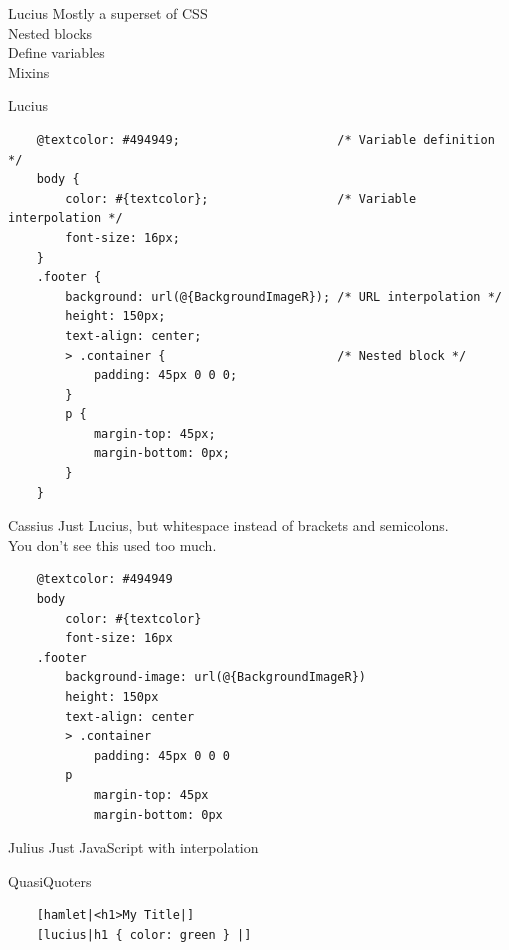 \documentclass[pdf]{beamer}
\begin{document}
\begin{frame}{Lucius}
  Mostly a superset of CSS\\
  Nested blocks\\
  Define variables\\
  Mixins\\
\end{frame}

\begin{frame}[fragile]{Lucius}
  \begin{verbatim}
    @textcolor: #494949;                      /* Variable definition */
    body {
        color: #{textcolor};                  /* Variable interpolation */
        font-size: 16px;
    }
    .footer {
        background: url(@{BackgroundImageR}); /* URL interpolation */
        height: 150px;
        text-align: center;
        > .container {                        /* Nested block */
            padding: 45px 0 0 0;
        }
        p {
            margin-top: 45px;
            margin-bottom: 0px;
        }
    }
  \end{verbatim}
\end{frame}

\begin{frame}[fragile]{Cassius}
  Just Lucius, but whitespace instead of brackets and semicolons.\\
  You don't see this used too much.\\
  \begin{verbatim}
    @textcolor: #494949
    body
        color: #{textcolor}
        font-size: 16px
    .footer
        background-image: url(@{BackgroundImageR})
        height: 150px
        text-align: center
        > .container
            padding: 45px 0 0 0
        p
            margin-top: 45px
            margin-bottom: 0px
  \end{verbatim}
\end{frame}

\begin{frame}{Julius}
  Just JavaScript with interpolation\\
\end{frame}

\begin{frame}[fragile]{QuasiQuoters}
  \begin{verbatim}
    [hamlet|<h1>My Title|]
    [lucius|h1 { color: green } |]
  \end{verbatim}
\end{frame}
\end{document}
